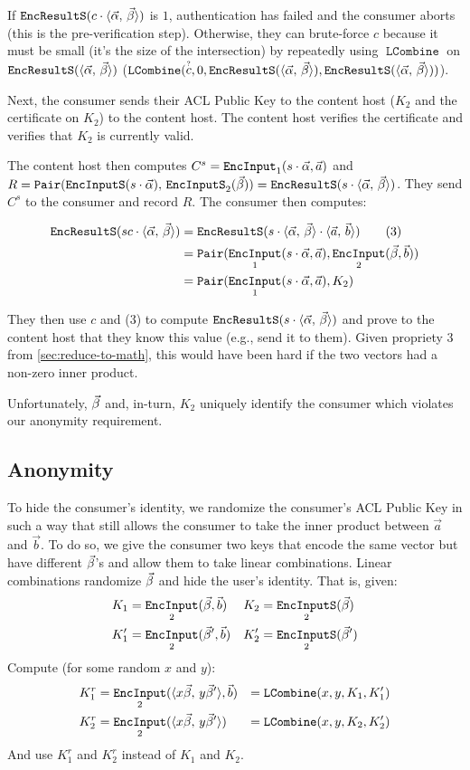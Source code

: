 \documentclass[pdftex,12pt,a4papaer,twoside,notitlepage]{report}
\newcommand{\iprod}[2]{\langle #1,\,#2\rangle}
\DeclareMathOperator{\ein}{\mathtt{EncInput}}
\DeclareMathOperator{\combine}{\mathtt{LCombine}}
\DeclareMathOperator{\eins}{\mathtt{EncInputS}}
\DeclareMathOperator{\eouts}{\mathtt{EncResultS}}
\DeclareMathOperator{\pair}{\mathtt{Pair}}
\begin{document}
If $\eouts(c \cdot \ABp)$ is $1$, authentication has failed and the consumer
aborts (this is the pre-verification step). Otherwise, they can brute-force $c$
because it must be small (it's the size of the intersection) by repeatedly using
$\combine$ on $\eouts(\ABp)$ ($\combine(\stackrel{\text{\tiny ?}}{c}, 0, \eouts(\ABp),
\eouts(\ABp))$).

Next, the consumer sends their ACL Public Key to the content host ($K_2$ and the
certificate on $K_2$) to the content host. The content host verifies the
certificate and verifies that $K_2$ is currently valid.

The content host then computes $C^s = \ein_1(s\cdot\Ap, \vec{a})$ and $R =
\pair(\eins(s\cdot \Ap),\,\eins_2(\Bp)) = \eouts(s\cdot \ABp)$. They send $C^s$
to the consumer and record $R$. The consumer then computes:

\begin{align*}
  \eouts(sc \cdot \ABp) &= \eouts(s \cdot \ABp \cdot \iprod{\vec{a}}{\vec{b}}) \tag{3} \\
                        &= \pair(\ein_1(s \cdot \Ap, \vec{a}), \ein_2(\Bp, \vec{b})) \\
                        &= \pair(\ein_1(s \cdot \Ap, \vec{a}), K_2) \\
\end{align*}

They then use $c$ and (3) to compute $\eouts(s\cdot\ABp)$ and prove to the
content host that they know this value (e.g., send it to them). Given propriety
3 from \cref{sec:reduce-to-math}, this would have been hard if the two vectors
had a non-zero inner product.

Unfortunately, $\vec{\beta}$ and, in-turn, $K_2$ uniquely identify the consumer which
violates our anonymity requirement.

\subsection{Anonymity}

To hide the consumer's identity, we randomize the consumer's ACL Public Key in
such a way that still allows the consumer to take the inner product between
$\vec{a}$ and $\vec{b}$. To do so, we give the consumer two keys that encode the
same vector but have different $\vec{\beta}$'s and allow them to take linear
combinations. Linear combinations randomize $\vec{\beta}$ and hide the user's identity.
That is, given:
\begin{align*}
  K_1 &= \ein_2(\Bp, \vec{b}) & K_2 &= \eins_2(\Bp) \\
  K^\prime_1 &= \ein_2(\Bp^\prime, \vec{b}) & K^\prime_2 &= \eins_2(\Bp^\prime)
\end{align*}
Compute (for some random $x$ and $y$):
\begin{align*}
  K^r_1 &= \ein_2(\iprod{x\Bp}{y\Bp^\prime}, \vec{b}) &= \combine(x, y, K_1, K_1^\prime) \\
  K^r_2 &= \ein_2(\iprod{x\Bp}{y\Bp^\prime}) &= \combine(x, y, K_2, K_2^\prime) \\
\end{align*}
And use $K_1^r$ and $K_2^r$ instead of $K_1$ and $K_2$.
\end{document}
